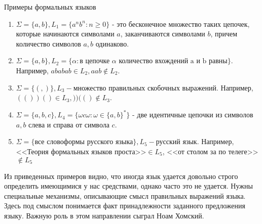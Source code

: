 \documentclass[12pt, pdf, hyperref={unicode},handout]{beamer}
\begin{document}
\begin{frame}{Примеры формальных языков}
  \begin{block}

    \small{
      \begin{enumerate}
      \item{$\Sigma=\{a,b\}, L_1=\{a^nb^n:n\geq 0\}$ - это бесконечное множество таких цепочек, которые начинаются символами $a$, заканчиваются символами $b$, причем количество символов $a,b$ одинаково.}
      \item{$\Sigma=\{a,b\}, L_2=\{\alpha:\text{в цепочке $\alpha$ количество вхождений a и b равны}\}$. Например, $ababab\in L_2, aab\not \in L_2$.}
      \item{$\Sigma=\{(,)\}, L_3 - \text{множество правильных скобочных выражений}$. Например, $(())()\in L_3, ))(()\not \in L_3$.}
      \item{$\Sigma=\{a,b,c\}, L_4=\{\omega c \omega : \omega\in \{a,b\}^*\}$ - две идентичные цепочки из символов $a,b$ слева и справа от символа $c$.}
        \item{$\Sigma=\{\text{все словоформы русского языка}\}, L_5 - \text{русский язык}$. Например, <<Теория формальных языков проста>>$\in L_5$, <<от столом за по телеге>>$\not\in L_5$}
        \end{enumerate}

        Из приведенных примеров видно, что иногда язык удается довольно строго определить имеющимися у нас средствами, однако часто это не удается. Нужны специальные механизмы, описывающие смысл правильных выражений языка. Здесь под смыслом понимается факт принадлежности заданного предложения языку. Важную роль в этом направлении сыграл Ноам Хомский.
      }

  \end{block}
  
\end{frame}
\end{document}
